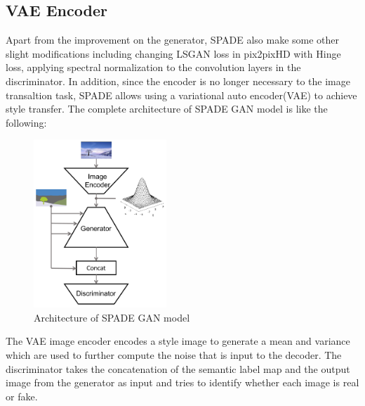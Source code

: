 \subsection{VAE Encoder}
Apart from the improvement on the generator, SPADE also make some other slight modifications
including changing LSGAN loss in pix2pixHD with 
Hinge loss, applying spectral normalization to the convolution layers in the discriminator.
In addition, since the encoder is no longer necessary to the image transaltion task, SPADE 
allows using a variational auto encoder(VAE) to achieve style transfer. The complete 
architecture of SPADE GAN model is like the following:
\begin{figure}[H]
    \begin{center}
    \includegraphics[width=5cm]{figures/SPADE-architecture}
    \end{center}
    \caption{Architecture of SPADE GAN model}
    \label{fig:SPADE-architecture}
\end{figure}
The VAE image encoder encodes a style image to generate a mean and variance which are used 
to further compute the noise that is input to the decoder. The discriminator takes the 
concatenation of the semantic label map and the output image from the generator as input 
and tries to identify whether each image is real or fake.


